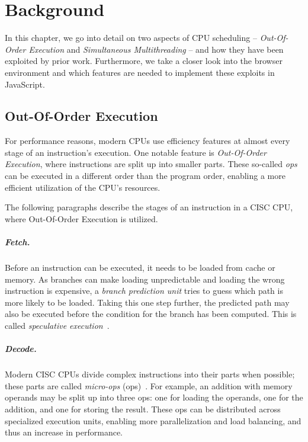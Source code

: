 \documentclass[11pt,
  titlepage=false,
  parskip=half,      %
]{scrreprt}
\begin{document}
\chapter{Background}
\label{ch:background}

In this chapter, we go into detail on two aspects of CPU scheduling
-- \textit{Out-Of-Order Execution} and \textit{Simultaneous Multithreading} --
and how they have been exploited by prior work.
Furthermore, we take a closer look into the browser environment and which features are needed to implement these exploits in JavaScript.

\section{Out-Of-Order Execution}
\label{sec:outoforderexecution}
For performance reasons, modern CPUs use efficiency features at almost every stage of an instruction's execution.
One notable feature is \textit{Out-Of-Order Execution},
where instructions are split up into smaller parts.
These so-called \textit{\textmu ops} can be executed in a different order than the program order,
enabling a more efficient utilization of the CPU's resources.

The following paragraphs describe the stages of an instruction in a CISC CPU,
where Out-Of-Order Execution is utilized.

\paragraph{Fetch.}
Before an instruction can be executed, it needs to be loaded from cache or memory.
As branches can make loading unpredictable and loading the wrong instruction is expensive, a \textit{branch prediction unit} tries to guess which path is more likely to be loaded.
Taking this one step further, the predicted path may also be executed before the condition for the branch has been computed.
This is called \textit{speculative execution}~\cite{AMD2020OptimizationEPYC7002}.

\paragraph{Decode.}
Modern CISC CPUs divide complex instructions into their parts when possible;
these parts are called \textit{micro-ops} (\textmu ops)~\cite{AMD2020OptimizationEPYC7002}.
For example, an addition with memory operands may be split up into three \textmu ops: one for loading the operands, one for the addition, and one for storing the result.
These \textmu ops can be distributed across specialized execution units, enabling more parallelization and load balancing, and thus an increase in performance.
\end{document}
